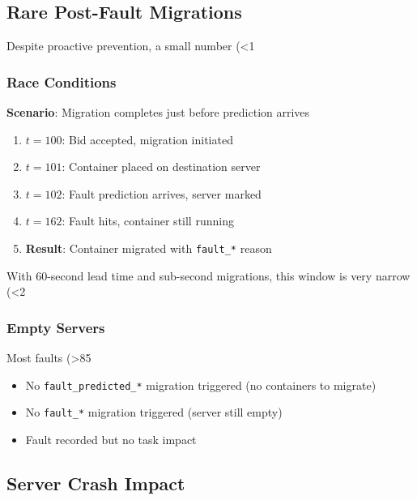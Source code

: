 \documentclass[12pt,a4paper]{article}
\begin{document}
\subsection{Rare Post-Fault Migrations}

Despite proactive prevention, a small number (\textless 1\\%

\subsubsection{Race Conditions}

\textbf{Scenario}: Migration completes just before prediction arrives
\begin{enumerate}
    \item $t=100$: Bid accepted, migration initiated
    \item $t=101$: Container placed on destination server
    \item $t=102$: Fault prediction arrives, server marked
    \item $t=162$: Fault hits, container still running
    \item \textbf{Result}: Container migrated with \texttt{fault\_*} reason
\end{enumerate}

With 60-second lead time and sub-second migrations, this window is very narrow (\textless 2\\%

\subsubsection{Empty Servers}

Most faults (\textgreater 85\\%
\begin{itemize}
    \item No \texttt{fault\_predicted\_*} migration triggered (no containers to migrate)
    \item No \texttt{fault\_*} migration triggered (server still empty)
    \item Fault recorded but no task impact
\end{itemize}

\subsection{Server Crash Impact}
\end{document}
